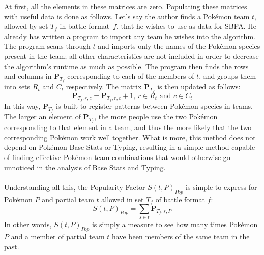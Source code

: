 \documentclass{article}
\begin{document}
At first, all the elements in these matrices are zero. Populating these matrices with useful data is done as follows. Let's say the author finds a Pok\'emon team $t$, allowed by set $T_f$ in battle format~$f$, that he wishes to use as data for SBPA. He already has written a program to import any team he wishes into the algorithm. The program scans through $t$ and imports only the names of the Pok\'emon species present in the team; all other characteristics are not included in order to decrease the algorithm's runtime as much as possible. The program then finds the rows and columns in $\textbf{P}_{T_f}$ corresponding to each of the members of $t$, and groups them into sets $R_t$ and $C_t$ respectively. The matrix $\textbf{P}_{T_f}$ is then updated as follows:
\begin{equation*}
	\textbf{P}_{T_f,r,c}=\textbf{P}_{T_f,r,c}+1\text{, }r\in R_t\text{ and }c\in C_t
\end{equation*}
In this way, $\textbf{P}_{T_f}$ is built to register patterns between Pok\'emon species in teams. The larger an element of $\textbf{P}_{T_f}$, the more people use the two Pok\'emon corresponding to that element in a team, and thus the more likely that the two corresponding Pok\'emon work well together. What is more, this method does not depend on Pok\'emon Base Stats or Typing, resulting in a simple method capable of finding effective Pok\'emon team combinations that would otherwise go unnoticed in the analysis of Base Stats and Typing.\\\\
Understanding all this, the Popularity Factor $S(t,P)_{Pop}$ is simple to express for Pok\'emon $P$ and partial team $t$ allowed in set $T_f$ of battle format $f$:
\begin{equation}\label{popScoreEqn}
	S(t,P)_{Pop}=\sum_{s\in t}\textbf{P}_{T_f,s,P}
\end{equation}
In other words, $S(t,P)_{Pop}$ is simply a measure to see how many times Pok\'emon $P$ and a member of partial team $t$ have been members of the same team in the past.
\end{document}

